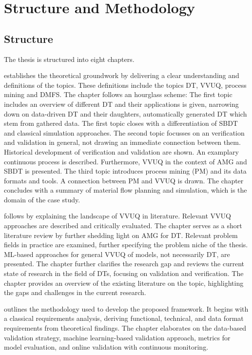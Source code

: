 \section{Structure and Methodology}

\subsection{Structure}

The thesis is structured into eight chapters.

 establishes the theoretical groundwork by delivering a clear understanding and definitions of the topics. These definitions include the topics DT, VVUQ, process mining and DMFS. The chapter follows an hourglass scheme: The first topic includes an overview of different DT and their applications is given, narrowing down on data-driven DT and their daughters, automatically generated DT which stem from gathered data. The first topic closes with a differentiation of SBDT and classical simulation approaches. The second topic focusses on an verification and validation in general, not drawing an immediate connection between them. Historical development of verification and validation are shown. An examplary continuous process is described. Furthermore, VVUQ in the context of AMG and SBDT is presented. The third topic introduces process mining (PM) and its data formats and tools. A connection between PM and VVUQ is drawn. The chapter concludes with a summary of material flow planning and simulation, which is the domain of the case study.

 follows by explaining the landscape of VVUQ in literature. Relevant VVUQ approaches are described and critically evaluated. The chapter serves as a short literature review by further shedding light on AMG for DT. Relevant problem fields in practice are examined, further specifying the problem niche of the thesis. ML-based approaches for general VVUQ of models, not necessarily DT, are presented. The chapter further clarifies the research gap and reviews the current state of research in the field of DTs, focusing on validation and verification. The chapter provides an overview of the existing literature on the topic, highlighting the gaps and challenges in the current research.

 outlines the methodology used to develop the proposed framework. It begins with a classical requirements analysis, deriving functional, technical, and data format requirements from theoretical findings. The chapter elaborates on the data-based validation strategy, machine learning-based validation approach, metrics for model evaluation, and online validation with continuous monitoring.

